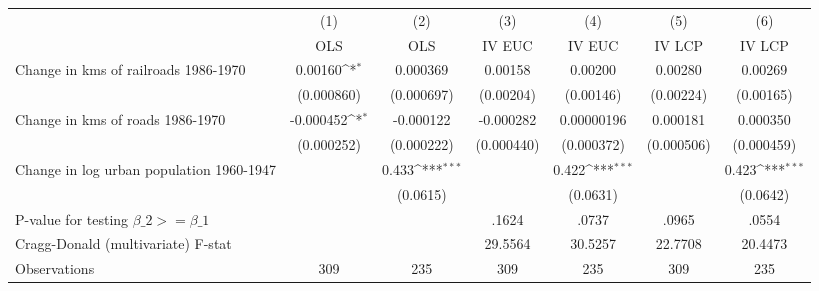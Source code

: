 {
\def\sym#1{\ifmmode^{#1}\else\(^{#1}\)\fi}
\begin{tabular}{l*{6}{c}}
\hline\hline
                &\multicolumn{1}{c}{(1)}&\multicolumn{1}{c}{(2)}&\multicolumn{1}{c}{(3)}&\multicolumn{1}{c}{(4)}&\multicolumn{1}{c}{(5)}&\multicolumn{1}{c}{(6)}\\
                &\multicolumn{1}{c}{OLS}&\multicolumn{1}{c}{OLS}&\multicolumn{1}{c}{IV EUC}&\multicolumn{1}{c}{IV EUC}&\multicolumn{1}{c}{IV LCP}&\multicolumn{1}{c}{IV LCP}\\
\hline
Change in kms of railroads 1986-1970&  0.00160\sym{*}  & 0.000369         &  0.00158         &  0.00200         &  0.00280         &  0.00269         \\
                &(0.000860)         &(0.000697)         &(0.00204)         &(0.00146)         &(0.00224)         &(0.00165)         \\
[1em]
Change in kms of roads 1986-1970&-0.000452\sym{*}  &-0.000122         &-0.000282         &0.00000196         & 0.000181         & 0.000350         \\
                &(0.000252)         &(0.000222)         &(0.000440)         &(0.000372)         &(0.000506)         &(0.000459)         \\
[1em]
Change in log urban population 1960-1947&                  &    0.433\sym{***}&                  &    0.422\sym{***}&                  &    0.423\sym{***}\\
                &                  & (0.0615)         &                  & (0.0631)         &                  & (0.0642)         \\
\hline
P-value for testing $\beta\_{2} >= \beta\_{1}$&                  &                  &    .1624         &    .0737         &    .0965         &    .0554         \\
Cragg-Donald (multivariate) F-stat&                  &                  &  29.5564         &  30.5257         &  22.7708         &  20.4473         \\
Observations    &      309         &      235         &      309         &      235         &      309         &      235         \\
\hline\hline
\end{tabular}
}
